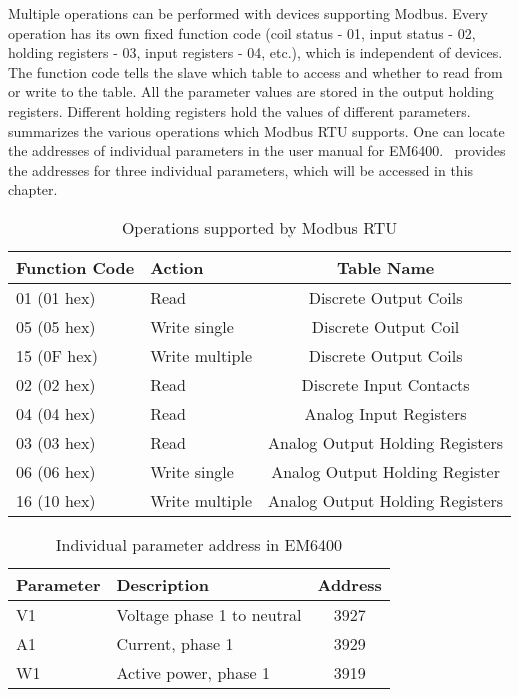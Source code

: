 Multiple operations can be performed with devices supporting Modbus.
Every operation has its own fixed function code (coil status - 01,
input status - 02, holding registers - 03, input registers - 04, etc.),
which is independent of devices. The function code tells the slave which
table to access and whether to read from or write to the table.
All the parameter values are stored in the output holding registers.
Different holding registers hold the values of different parameters.
 summarizes the various operations which
Modbus RTU supports. One can locate the addresses of individual parameters
in the user manual for EM6400.  provides the addresses
for three individual parameters, which will be accessed in this chapter.


\begin{table}
  \centering
  \caption{Operations supported by Modbus RTU}
  \label{tab:modbus-fun-codes}
  \begin{tabular}{llc}\hline
    Function Code & Action         & Table Name                      \\  \hline
    01 (01 hex)   & Read           & Discrete Output Coils           \\
    05 (05 hex)   & Write single   & Discrete Output Coil            \\
    15 (0F hex)   & Write multiple & Discrete Output Coils           \\
    02 (02 hex)   & Read           & Discrete Input Contacts         \\
    04 (04 hex)   & Read           & Analog Input Registers          \\
    03 (03 hex)   & Read           & Analog Output Holding Registers \\
    06 (06 hex)   & Write single   & Analog Output Holding Register  \\
    16 (10 hex)   & Write multiple & Analog Output Holding Registers \\
    \hline
  \end{tabular}
\end{table}


\begin{table}
  \centering
  \caption{Individual parameter address in EM6400}
  \label{tab:params-addr}
  \begin{tabular}{llc}\hline
    Parameter & Description                & Address \\  \hline
    V1        & Voltage phase 1 to neutral & 3927    \\
    A1        & Current, phase 1           & 3929    \\
    W1        & Active power, phase 1      & 3919    \\
    \hline
  \end{tabular}
\end{table}



